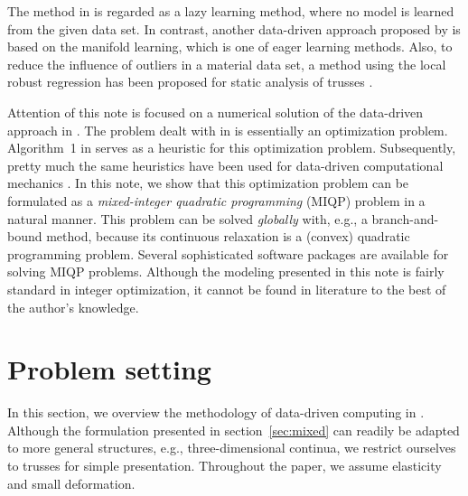 \documentclass[a4paper,11pt]{scrartcl}
\theoremstyle{plain}
\theoremstyle{definition}
\theoremstyle{remark}
\begin{document}
The method in \cite{KO16} is regarded as a lazy learning method, where 
no model is learned from the given data set. 
In contrast, another data-driven approach proposed by 
\citet{IAcAGCC18,IBAAcCLC17} is based on the manifold learning, which is 
one of eager learning methods. 
Also, to reduce the influence of outliers in a material data set, a method 
using the local robust regression has been proposed for static analysis 
of trusses \cite{Kan18}. 

Attention of this note is focused on a numerical solution of the 
data-driven approach in \cite{KO16}. 
The problem dealt with in \cite{KO16} is essentially an optimization 
problem. 
Algorithm~1 in \cite{KO16} serves as a heuristic for this optimization problem. 
Subsequently, pretty much the same heuristics have been used for 
data-driven computational mechanics \cite{NK18,LCRSV18}. 
In this note, we show that this optimization problem can be formulated 
as a {\em mixed-integer quadratic programming\/} (MIQP) problem in a 
natural manner. 
This problem can be solved {\em globally\/} with, 
e.g., a branch-and-bound method, 
because its continuous relaxation is a (convex) quadratic programming problem. 
Several sophisticated software packages are available for solving MIQP problems. 
Although the modeling presented in this note is fairly standard in 
integer optimization, it cannot be found in literature to the best of 
the author's knowledge. 


























\section{Problem setting}
\label{sec:problem}
In this section, we overview the methodology of data-driven computing in \cite{KO16}. 
Although the formulation presented in section~\ref{sec:mixed} can 
readily be adapted to more general structures, e.g., three-dimensional 
continua, we restrict ourselves to trusses for simple presentation. 
Throughout the paper, we assume elasticity and small deformation. 
\end{document}
